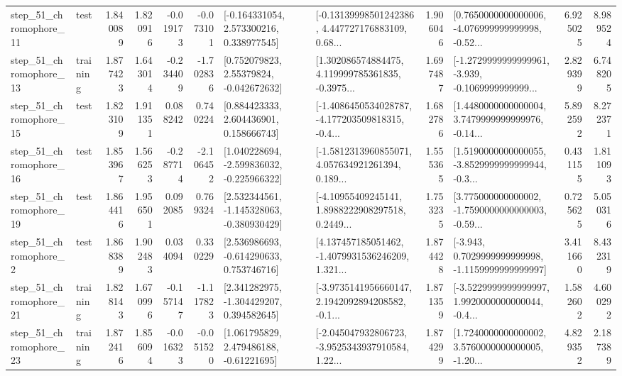 \begin{tabular}{llrrrrllrlrr}
   step\_51\_chromophore\_11 &      test &      1.840089 &    1.820916 &     -0.019173 & -0.073101 &    [-0.164331054, 2.573300216, 0.338977545] &  [-0.13139998501242386, 4.447727176883109, 0.68... &       1.906046 &  [0.7650000000000006, -4.076999999999998, -0.52... &            6.925025 &          8.989524 \\
   step\_51\_chromophore\_13 &  training &      1.877423 &    1.643014 &     -0.234409 & -1.702836 &     [0.752079823, 2.55379824, -0.042672632] &  [1.302086574884475, 4.119999785361835, -0.3975... &       1.697487 &  [-1.2729999999999961, -3.939, -0.1069999999999... &            2.829399 &          6.748205 \\
   step\_51\_chromophore\_15 &      test &      1.823109 &    1.911351 &      0.088242 &  0.740224 &     [0.884423333, 2.604436901, 0.158666743] &  [-1.4086450534028787, -4.177203509818315, -0.4... &       1.682786 &  [1.4480000000000004, 3.7479999999999976, -0.14... &            5.892592 &          8.272371 \\
   step\_51\_chromophore\_16 &      test &      1.853967 &    1.566253 &     -0.287714 & -2.106452 &   [1.040228694, -2.599836032, -0.225966322] &  [-1.5812313960855071, 4.057634921261394, 0.189... &       1.555365 &  [1.5190000000000055, -3.8529999999999944, -0.3... &            0.431155 &          1.811093 \\
   step\_51\_chromophore\_19 &      test &      1.864416 &    1.956501 &      0.092085 &  0.769324 &   [2.532344561, -1.145328063, -0.380930429] &  [-4.10955409245141, 1.8988222908297518, 0.2449... &       1.753235 &  [3.775000000000002, -1.7590000000000003, -0.59... &            0.725625 &          5.050316 \\
    step\_51\_chromophore\_2 &      test &      1.868389 &    1.902483 &      0.034094 &  0.330229 &    [2.536986693, -0.614290633, 0.753746716] &  [4.137457185051462, -1.4079931536246209, 1.321... &       1.874428 &  [-3.943, 0.7029999999999998, -1.1159999999999997] &            3.411660 &          8.432319 \\
   step\_51\_chromophore\_21 &  training &      1.828143 &    1.670996 &     -0.157147 & -1.117823 &    [2.341282975, -1.304429207, 0.394582645] &  [-3.9735141956660147, 2.1942092894208582, -0.1... &       1.871359 &  [-3.5229999999999997, 1.9920000000000044, -0.4... &            1.582602 &          4.600292 \\
   step\_51\_chromophore\_23 &  training &      1.872416 &    1.856094 &     -0.016323 & -0.051520 &     [1.061795829, 2.479486188, -0.61221695] &  [-2.045047932806723, -3.9525343937910584, 1.22... &       1.874299 &  [1.7240000000000002, 3.5760000000000005, -1.20... &            4.829352 &          2.187389 \\

\end{tabular}
